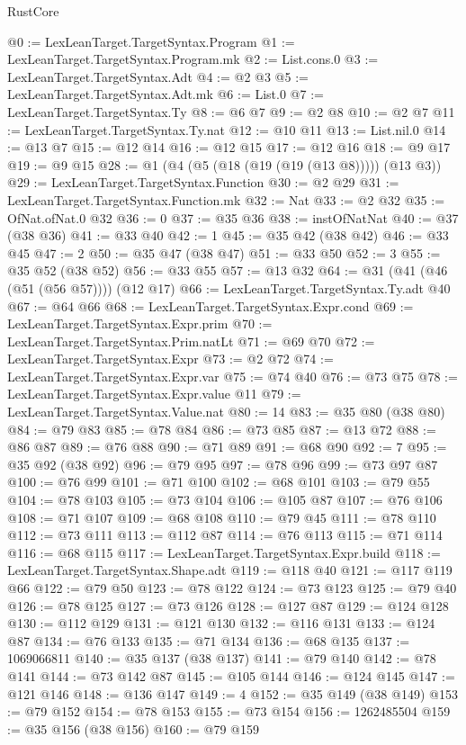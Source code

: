 \begin{lexlean}{RustCore}
\begin{coremodule}
@0 := LexLeanTarget.TargetSyntax.Program
@1 := LexLeanTarget.TargetSyntax.Program.mk
@2 := List.cons.{0}
@3 := LexLeanTarget.TargetSyntax.Adt
@4 := @2 @3
@5 := LexLeanTarget.TargetSyntax.Adt.mk
@6 := List.{0}
@7 := LexLeanTarget.TargetSyntax.Ty
@8 := @6 @7
@9 := @2 @8
@10 := @2 @7
@11 := LexLeanTarget.TargetSyntax.Ty.nat
@12 := @10 @11
@13 := List.nil.{0}
@14 := @13 @7
@15 := @12 @14
@16 := @12 @15
@17 := @12 @16
@18 := @9 @17
@19 := @9 @15
@28 := @1 (@4 (@5 (@18 (@19 (@19 (@13 @8))))) (@13 @3))
@29 := LexLeanTarget.TargetSyntax.Function
@30 := @2 @29
@31 := LexLeanTarget.TargetSyntax.Function.mk
@32 := Nat
@33 := @2 @32
@35 := OfNat.ofNat.{0} @32
@36 := 0
@37 := @35 @36
@38 := instOfNatNat
@40 := @37 (@38 @36)
@41 := @33 @40
@42 := 1
@45 := @35 @42 (@38 @42)
@46 := @33 @45
@47 := 2
@50 := @35 @47 (@38 @47)
@51 := @33 @50
@52 := 3
@55 := @35 @52 (@38 @52)
@56 := @33 @55
@57 := @13 @32
@64 := @31 (@41 (@46 (@51 (@56 @57)))) (@12 @17)
@66 := LexLeanTarget.TargetSyntax.Ty.adt @40
@67 := @64 @66
@68 := LexLeanTarget.TargetSyntax.Expr.cond
@69 := LexLeanTarget.TargetSyntax.Expr.prim
@70 := LexLeanTarget.TargetSyntax.Prim.natLt
@71 := @69 @70
@72 := LexLeanTarget.TargetSyntax.Expr
@73 := @2 @72
@74 := LexLeanTarget.TargetSyntax.Expr.var
@75 := @74 @40
@76 := @73 @75
@78 := LexLeanTarget.TargetSyntax.Expr.value @11
@79 := LexLeanTarget.TargetSyntax.Value.nat
@80 := 14
@83 := @35 @80 (@38 @80)
@84 := @79 @83
@85 := @78 @84
@86 := @73 @85
@87 := @13 @72
@88 := @86 @87
@89 := @76 @88
@90 := @71 @89
@91 := @68 @90
@92 := 7
@95 := @35 @92 (@38 @92)
@96 := @79 @95
@97 := @78 @96
@99 := @73 @97 @87
@100 := @76 @99
@101 := @71 @100
@102 := @68 @101
@103 := @79 @55
@104 := @78 @103
@105 := @73 @104
@106 := @105 @87
@107 := @76 @106
@108 := @71 @107
@109 := @68 @108
@110 := @79 @45
@111 := @78 @110
@112 := @73 @111
@113 := @112 @87
@114 := @76 @113
@115 := @71 @114
@116 := @68 @115
@117 := LexLeanTarget.TargetSyntax.Expr.build
@118 := LexLeanTarget.TargetSyntax.Shape.adt
@119 := @118 @40
@121 := @117 @119 @66
@122 := @79 @50
@123 := @78 @122
@124 := @73 @123
@125 := @79 @40
@126 := @78 @125
@127 := @73 @126
@128 := @127 @87
@129 := @124 @128
@130 := @112 @129
@131 := @121 @130
@132 := @116 @131
@133 := @124 @87
@134 := @76 @133
@135 := @71 @134
@136 := @68 @135
@137 := 1069066811
@140 := @35 @137 (@38 @137)
@141 := @79 @140
@142 := @78 @141
@144 := @73 @142 @87
@145 := @105 @144
@146 := @124 @145
@147 := @121 @146
@148 := @136 @147
@149 := 4
@152 := @35 @149 (@38 @149)
@153 := @79 @152
@154 := @78 @153
@155 := @73 @154
@156 := 1262485504
@159 := @35 @156 (@38 @156)
@160 := @79 @159

\end{coremodule}
\end{lexlean}
